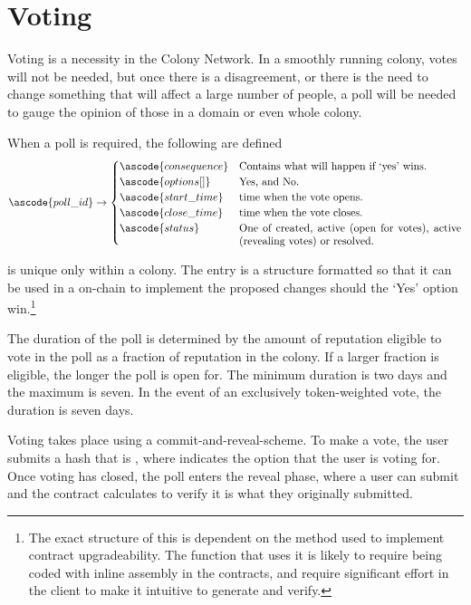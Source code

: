 \section{Voting}\label{sec:voting}
Voting is a necessity in the Colony Network. In a smoothly running colony, votes will not be needed, but once there is a disagreement, or there is the need to change something that will affect a large number of people, a poll will be needed to gauge the opinion of those in a domain or even whole colony.

When a poll is required, the following are defined
\begin{equation*}
  \ascode{poll\_id} \rightarrow
  \begin{cases}
    \ascode{consequence} &	\textnormal{Contains what will happen if `yes' wins.}\\
    \ascode{options[]} &	\parbox[t]{.6\linewidth}{\textnormal{Yes, and No.}}\\
    \ascode{start\_time} &	\textnormal{time when the vote opens.}\\
    \ascode{close\_time} &	\textnormal{time when the vote closes.}\\
    \ascode{status} &	\parbox[t]{.6\linewidth}{\textnormal{One of created, active (open for votes), active (revealing votes) or resolved.}}
  \end{cases}
\end{equation*}

 is unique only within a colony. The  entry is a structure formatted so that it can be used in a on-chain to implement the proposed changes should the `Yes' option win.\footnote{The exact structure of this is dependent on the method used to implement contract upgradeability. The function that uses it is likely to require being coded with inline assembly in the contracts, and require significant effort in the client to make it intuitive to generate and verify.}

The duration of the poll is determined by the amount of reputation eligible to vote in the poll as a fraction of reputation in the colony. If a larger fraction is eligible, the longer the poll is open for. The minimum duration is two days and the maximum is seven. In the event of an exclusively token-weighted vote, the duration is seven days.

Voting takes place using a commit-and-reveal-scheme. To make a vote, the user submits a hash that is , where  indicates the option that the user is voting for. Once voting has closed, the poll enters the reveal phase, where a user can submit  and the contract calculates  to verify it is what they originally submitted.

